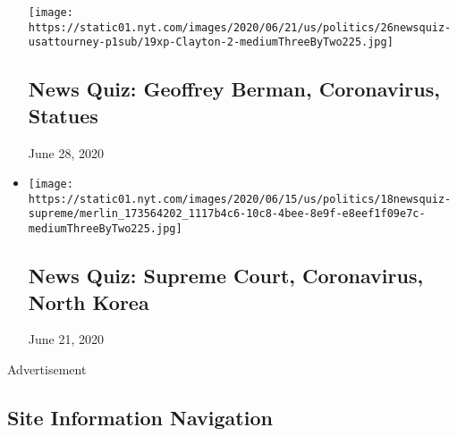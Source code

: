 \begin{itemize}
  \texttt{[image: https://static01.nyt.com/images/2020/06/21/us/politics/26newsquiz-usattourney-p1sub/19xp-Clayton-2-mediumThreeByTwo225.jpg]}

  \hypertarget{news-quiz-geoffrey-berman-coronavirus-statues}{%
  \subsection{News Quiz: Geoffrey Berman, Coronavirus,
  Statues}\label{news-quiz-geoffrey-berman-coronavirus-statues}}

  June 28, 2020
\item
  \href{https://www.nytimes.com/interactive/2020/06/19/briefing/supreme-court-coronavirus-north-korea-news-quiz.html}{}

  \texttt{[image: https://static01.nyt.com/images/2020/06/15/us/politics/18newsquiz-supreme/merlin\_173564202\_1117b4c6-10c8-4bee-8e9f-e8eef1f09e7c-mediumThreeByTwo225.jpg]}

  \hypertarget{news-quiz-supreme-court-coronavirus-north-korea}{%
  \subsection{News Quiz: Supreme Court, Coronavirus, North
  Korea}\label{news-quiz-supreme-court-coronavirus-north-korea}}

  June 21, 2020
\end{itemize}

Advertisement

\hypertarget{site-information-navigation}{%
\subsection{Site Information
Navigation}\label{site-information-navigation}}

